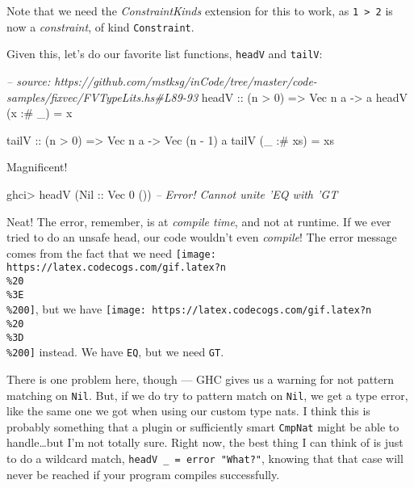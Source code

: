 \documentclass[]{article}
\newenvironment{Shaded}{}{}
\newcommand{\DataTypeTok}[1]{\textcolor[rgb]{0.56,0.13,0.00}{#1}}
\newcommand{\DecValTok}[1]{\textcolor[rgb]{0.25,0.63,0.44}{#1}}
\newcommand{\CommentTok}[1]{\textcolor[rgb]{0.38,0.63,0.69}{\textit{#1}}}
\newcommand{\OtherTok}[1]{\textcolor[rgb]{0.00,0.44,0.13}{#1}}
\newcommand{\FunctionTok}[1]{\textcolor[rgb]{0.02,0.16,0.49}{#1}}
\newcommand{\NormalTok}[1]{#1}
\begin{document}
Note that we need the \emph{ConstraintKinds} extension for this to work, as
\texttt{1\ \textgreater{}\ 2} is now a \emph{constraint}, of kind
\texttt{Constraint}.

Given this, let's do our favorite list functions, \texttt{headV} and
\texttt{tailV}:

\begin{Shaded}
\begin{Highlighting}[]
\CommentTok{-- source: https://github.com/mstksg/inCode/tree/master/code-samples/fixvec/FVTypeLits.hs#L89-93}
\OtherTok{headV ::}\NormalTok{ (n }\FunctionTok{>} \DecValTok{0}\NormalTok{) }\OtherTok{=>} \DataTypeTok{Vec}\NormalTok{ n a }\OtherTok{->}\NormalTok{ a}
\NormalTok{headV (x }\FunctionTok{:#}\NormalTok{ _)  }\FunctionTok{=}\NormalTok{ x}

\OtherTok{tailV ::}\NormalTok{ (n }\FunctionTok{>} \DecValTok{0}\NormalTok{) }\OtherTok{=>} \DataTypeTok{Vec}\NormalTok{ n a }\OtherTok{->} \DataTypeTok{Vec}\NormalTok{ (n }\FunctionTok{-} \DecValTok{1}\NormalTok{) a}
\NormalTok{tailV (_ }\FunctionTok{:#}\NormalTok{ xs) }\FunctionTok{=}\NormalTok{ xs}
\end{Highlighting}
\end{Shaded}

Magnificent!

\begin{Shaded}
\begin{Highlighting}[]
\NormalTok{ghci}\FunctionTok{>}\NormalTok{ headV (}\DataTypeTok{Nil}\OtherTok{ ::} \DataTypeTok{Vec} \DecValTok{0}\NormalTok{ ())}
\CommentTok{-- Error!  Cannot unite 'EQ with 'GT}
\end{Highlighting}
\end{Shaded}

Neat! The error, remember, is at \emph{compile time}, and not at runtime. If we
ever tried to do an unsafe head, our code wouldn't even \emph{compile}! The
error message comes from the fact that we need
\texttt{[image: https://latex.codecogs.com/gif.latex?n\\\%20\\\%3E\\\%200]}, but we
have \texttt{[image: https://latex.codecogs.com/gif.latex?n\\\%20\\\%3D\\\%200]}
instead. We have \texttt{EQ}, but we need \texttt{GT}.

There is one problem here, though --- GHC gives us a warning for not pattern
matching on \texttt{Nil}. But, if we do try to pattern match on \texttt{Nil}, we
get a type error, like the same one we got when using our custom type nats. I
think this is probably something that a plugin or sufficiently smart
\texttt{CmpNat} might be able to handle\ldots{}but I'm not totally sure. Right
now, the best thing I can think of is just to do a wildcard match,
\texttt{headV\ \_\ =\ error\ "What?"}, knowing that that case will never be
reached if your program compiles successfully.
\end{document}
